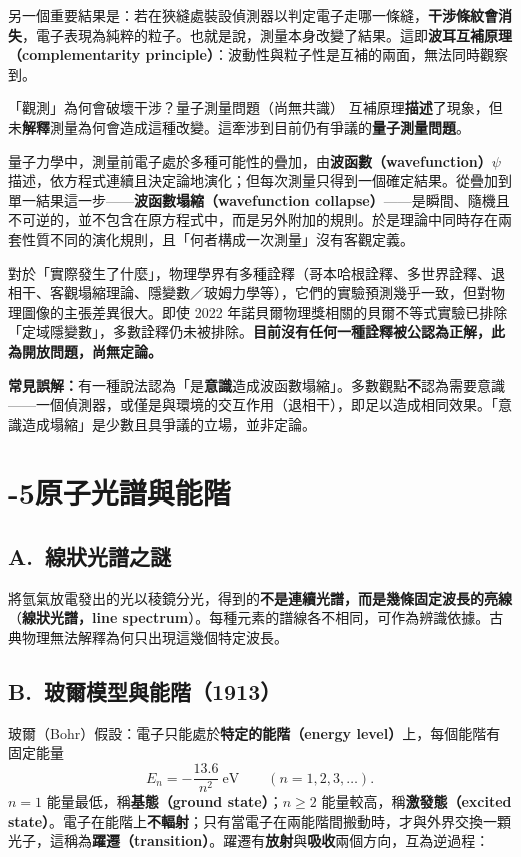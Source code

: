\documentclass[11pt]{article}
\begin{document}
另一個重要結果是：若在狹縫處裝設偵測器以判定電子走哪一條縫，\textbf{干涉條紋會消失}，電子表現為純粹的粒子。也就是說，測量本身改變了結果。這即\textbf{波耳互補原理（complementarity principle）}：波動性與粒子性是互補的兩面，無法同時觀察到。

\begin{延伸框}{「觀測」為何會破壞干涉？量子測量問題（尚無共識）}
互補原理\textbf{描述}了現象，但未\textbf{解釋}測量為何會造成這種改變。這牽涉到目前仍有爭議的\textbf{量子測量問題}。

量子力學中，測量前電子處於多種可能性的疊加，由\textbf{波函數（wavefunction）}$\psi$ 描述，依方程式連續且決定論地演化；但每次測量只得到一個確定結果。從疊加到單一結果這一步——\textbf{波函數塌縮（wavefunction collapse）}——是瞬間、隨機且不可逆的，並不包含在原方程式中，而是另外附加的規則。於是理論中同時存在兩套性質不同的演化規則，且「何者構成一次測量」沒有客觀定義。

對於「實際發生了什麼」，物理學界有多種詮釋（哥本哈根詮釋、多世界詮釋、退相干、客觀塌縮理論、隱變數／玻姆力學等），它們的實驗預測幾乎一致，但對物理圖像的主張差異很大。即使 2022 年諾貝爾物理獎相關的貝爾不等式實驗已排除「定域隱變數」，多數詮釋仍未被排除。\textbf{目前沒有任何一種詮釋被公認為正解，此為開放問題，尚無定論。}

\textbf{常見誤解：}有一種說法認為「是\textbf{意識}造成波函數塌縮」。多數觀點\textbf{不}認為需要意識——一個偵測器，或僅是與環境的交互作用（退相干），即足以造成相同效果。「意識造成塌縮」是少數且具爭議的立場，並非定論。
\end{延伸框}

\section*{-5\quad 原子光譜與能階}

\subsection*{\sffamily A.\ 線狀光譜之謎}

將氫氣放電發出的光以稜鏡分光，得到的\textbf{不是連續光譜，而是幾條固定波長的亮線}（\textbf{線狀光譜，line spectrum}）。每種元素的譜線各不相同，可作為辨識依據。古典物理無法解釋為何只出現這幾個特定波長。

\subsection*{\sffamily B.\ 玻爾模型與能階（1913）}

玻爾（Bohr）假設：電子只能處於\textbf{特定的能階（energy level）}上，每個能階有固定能量
$$E_n=-\frac{13.6}{n^2}\ \text{eV}\qquad(n=1,2,3,\dots).$$
$n=1$ 能量最低，稱\textbf{基態（ground state）}；$n\ge2$ 能量較高，稱\textbf{激發態（excited state）}。電子在能階上\textbf{不輻射}；只有當電子在兩能階間搬動時，才與外界交換一顆光子，這稱為\textbf{躍遷（transition）}。躍遷有\textbf{放射}與\textbf{吸收}兩個方向，互為逆過程：
\end{document}
